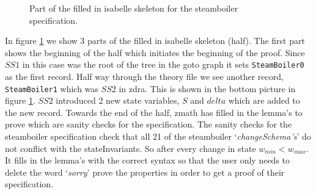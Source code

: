 \begin{figure}[H]
    \hfill
    \hfill
    \hfill
    \caption{Part of the filled in isabelle skeleton for the steamboiler specification.\label{fig:filledinsteamskeleton}}
\end{figure}

In figure \ref{fig:filledinsteamskeleton} we show 3 parts of the filled in
isabelle skeleton (\gls{half}). The first part shows the beginning of the
\gls{half} which initiates the beginning of the proof. Since $SS1$ in this case
was the root of the tree in the goto graph it sets \verb|SteamBoiler0| as the
first record. Half way through the theory file we see another record,
\verb|SteamBoiler1| which was $SS2$ in \gls{zdra}. This is shown in the bottom
picture in figure \ref{fig:filledinsteamskeleton}. $SS2$ introduced 2 new state
variables, $S$ and $delta$ which are added to the new record. Towards the end of
the \gls{half}, \gls{zmath} has filled in the lemma's to prove which are sanity
checks for the specification.
The sanity checks for the steamboiler specification check that all 21 of the 
steamboiler `\textit{changeSchema's}' do not conflict with the stateInvariants.
So after every change in state $w_{min}<w_{max}$.
It fills in the lemma's with the correct syntax so
that the user only needs to delete the word `\emph{sorry}' prove the properties
in order to get a proof of their specification. 

